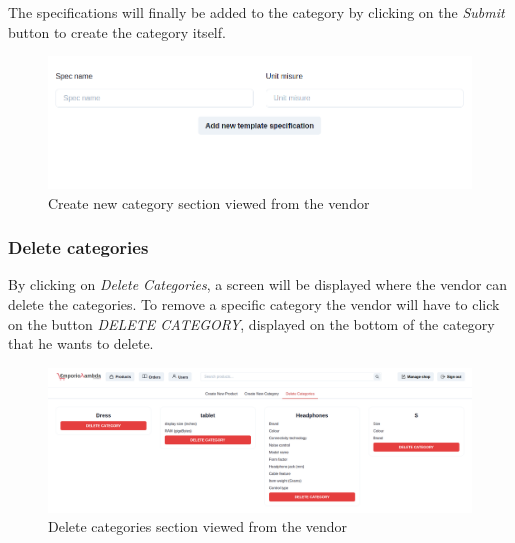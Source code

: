 The specifications will finally be added to the category by clicking on the \textit{Submit} button to create the category itself.
\begin{figure}[!ht]
    \caption{Create new category section viewed from the vendor}
    \vspace{5px}
    \includegraphics[scale=0.25]{../../../../Images/userManual/addSpecificationCategoryVendor.png}
    \centering
\end{figure}
\pagebreak
\subsubsection{Delete categories}
By clicking on \textit{Delete Categories}, a screen will be displayed where the vendor can delete the categories.\linebreak
To remove a specific category the vendor will have to click on the button \textit{DELETE CATEGORY}, displayed on the bottom of the category that he wants to delete.
\begin{figure}[!ht]
    \caption{Delete categories section viewed from the vendor}
    \vspace{5px}
    \includegraphics[scale=0.25]{../../../../Images/userManual/deleteCategoriesVendor.png}
    \centering
\end{figure}
\pagebreak
